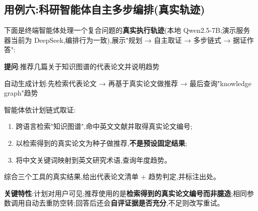 \subsection{用例六:科研智能体自主多步编排(真实轨迹)}
下面是终端智能体处理一个复合问题的\textbf{真实执行轨迹}(本地 Qwen2.5-7B;演示服务器当前为 DeepSeek,编排行为一致),展示"规划 → 自主取证 → 多步链式 → 据证作答":
\begin{plainbox}
\textbf{提问}:推荐几篇关于知识图谱的代表论文并说明趋势\par\vspace{3pt}
 自动生成计划:先检索代表论文 → 再基于真实论文做推荐 → 最后查询"knowledge graph"趋势\par\vspace{2pt}
 智能体依计划链式取证:
\begin{enumerate}[itemsep=1pt]
\item 跨语言检索"知识图谱",命中英文文献并取得真实论文编号;
\item 以检索得到的真实论文为种子做推荐,\textbf{不是预设固定结果};
\item 将中文关键词映射到英文研究术语,查询年度趋势。
\end{enumerate}
 综合三个工具的真实结果,给出代表论文清单 + 趋势判定,并标注出处。\par\vspace{2pt}
\textbf{关键特性}:计划对用户可见;推荐使用的是\textbf{检索得到的真实论文编号而非臆造};相同参数调用自动去重防空转;回答后还会\textbf{自评证据是否充分},不足则改写重试。
\end{plainbox}

